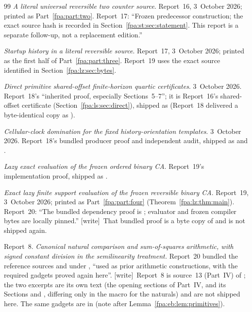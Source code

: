 \documentclass[11pt,a4paper]{article}
\numberwithin{equation}{section}
\newcommand{\wtag}{\textup{[write]}}
\begin{document}
\begin{thebibliography}{99}
\emph{A literal universal reversible two counter source}. Report~16, 3~October 2026; printed as Part~\ref{fpa:part:two}. Report~17: ``Frozen predecessor construction; the exact source hash is recorded in Section~\ref{fpa:st:sec:statement}. This report is a separate follow-up, not a replacement edition.''

\emph{Startup history in a literal reversible source}. Report~17, 3~October 2026; printed as the first half of Part~\ref{fpa:part:three}. Report~19 uses the exact source identified in Section~\ref{fpa:lz:sec:bytes}.

\emph{Direct primitive shared-offset finite-horizon quartic certificates}. 3~October 2026. Report~18's ``inherited proof, especially Sections~5--7''; it is Report~16's shared-offset certificate (Section~\ref{fpa:ls:sec:direct}), shipped as  (Report~18 delivered a byte-identical copy as ).

\emph{Cellular-clock domination for the fixed history-orientation templates}. 3~October 2026. Report~18's bundled producer proof and independent audit, shipped as  and .

\emph{Lazy exact evaluation of the frozen ordered binary CA}. Report~19's implementation proof, shipped as .

\emph{Exact lazy finite support evaluation of the frozen reversible binary CA}. Report~19, 3~October 2026; printed as Part~\ref{fpa:part:four} (Theorem~\ref{fpa:lz:thm:main}). Report~20: ``The bundled dependency proof is ; evaluator and frozen compiler bytes are locally pinned.'' \wtag\ That bundled proof is a byte copy of  and is not shipped again.

Report~8. \emph{Canonical natural comparison and sum-of-squares arithmetic, with signed constant division in the semilinearity treatment.} Report~20 bundled the reference sources  and  under , ``used as prior arithmetic constructions, with the required gadgets proved again here''. \wtag\ Report~8 is source~13 (Part~IV) of ; the two excerpts are its own text (the opening sections of Part~IV, and its Sections  and , differing only in the macro for the naturals) and are not shipped here. The same gadgets are in  (note after Lemma~\ref{fpa:eb:lem:primitives}).


\end{thebibliography}
\end{document}
